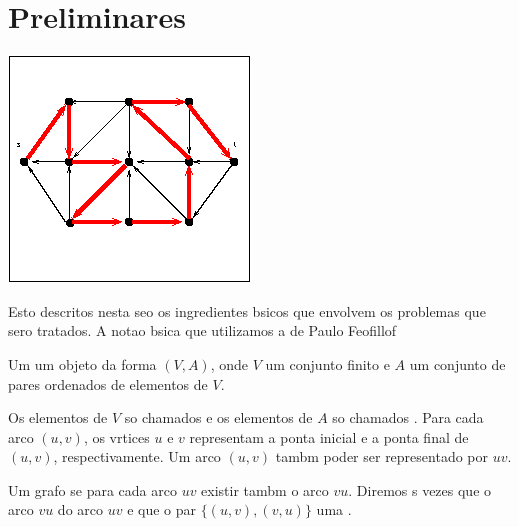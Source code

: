 
\chapter*{Preliminares}


\par
\begin{floatingfigure}[l]{30mm}
\begin{center}
  \includegraphics{./figs/rede}
\end{center} 
\end{floatingfigure}
\noindent




Esto descritos nesta seo os ingredientes bsicos que envolvem os
problemas que sero tratados. A notao bsica que utilizamos  a de
Paulo Feofillof~\cite{pf:aula}

Um   um objeto da forma $(V,A)$, 
onde $V$  um conjunto finito e $A$  um conjunto de pares ordenados 
de elementos de $V$. 

Os elementos de $V$ so chamados  e os
elementos de $A$ so chamados .  Para cada arco
$(u,v)$, os vrtices $u$ e $v$ representam a ponta inicial e a ponta final de
$(u,v)$, respectivamente.  Um arco $(u,v)$ tambm poder ser representado por
$uv$.

Um grafo   
se para cada arco $uv$ existir tambm o arco $vu$. Diremos s vezes
que o arco $vu$  
 do arco $uv$ e que o par $\{(u,v),(v,u)\}$  uma .
 
